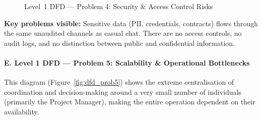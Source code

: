 \documentclass[12pt,a4paper]{report}
\begin{document}
\begin{figure}[H]
{
}
\caption{Level~1 DFD — Problem 4: Security \& Access Control Risks}
\label{fig:dfd_prob4}
\end{figure}

\begin{problemBox}
\textbf{Key problems visible:} Sensitive data (PII, credentials, contracts) flows through the same unaudited channels as casual chat. There are no access controls, no audit logs, and no distinction between public and confidential information.
\end{problemBox}

\paragraph{E. Level 1 DFD — Problem 5: Scalability \& Operational Bottlenecks}

This diagram (Figure~\ref{fig:dfd_prob5}) shows the extreme centralisation of coordination and decision-making around a very small number of individuals (primarily the Project Manager), making the entire operation dependent on their availability.
\end{document}
